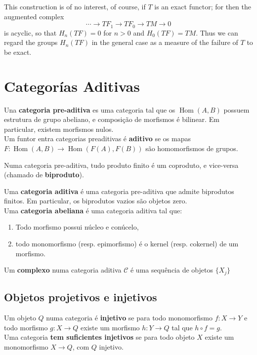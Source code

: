 This construction is of no interest, of course, if $T$ is an exact functor; for then the augmented complex
$$
\cdots \rightarrow T F_1 \rightarrow T F_0 \rightarrow T M \rightarrow 0
$$
is acyclic, so that $H_n(T F)=0$ for $n>0$ and $H_0(T F)=T M$. Thus we can regard the groups $H_n(T F)$ in the general case as a measure of the failure of $T$ to be exact.



\chapter{Categorías Aditivas}


Una \textbf{categoria pre-aditiva} es uma categoria tal que os $\operatorname{Hom}(A,B)$ possuem estrutura de grupo abeliano, e composição de morfismos é bilinear. Em particular, existem morfismos nulos.\\
Um funtor entra categorias preaditivas é \textbf{aditivo} se os mapas $F:\operatorname{Hom}(A,B)\rightarrow \operatorname{Hom}(F(A),F(B))$ são homomorfismos de grupos. 

\begin{prop}
	Numa categoria pre-aditiva, tudo produto finito é um coproduto, e vice-versa (chamado de \textbf{biproduto}). 
\end{prop}

Uma \textbf{categoria aditiva} é uma categoria pre-aditiva que admite biprodutos finitos. Em particular, os biprodutos vazios são objetos zero.\\

Uma \textbf{categoria abeliana} é uma categoria aditiva tal que:
\begin{enumerate}
	\item Todo morfismo possui núcleo e conúcelo,
	\item todo monomorfismo (resp. epimorfismo) é o kernel (resp. cokernel) de um morfismo.
\end{enumerate}


Um \textbf{complexo} numa categoria aditiva $\mathcal{C}$ é uma sequência de objetos $\{X_j\}$

\section{Objetos projetivos e injetivos}

Um objeto $Q$ numa categoria é \textbf{injetivo} se para todo monomorfismo $f:X\rightarrow Y$ e todo morfismo $g:X \rightarrow Q$ existe um morfismo $h: Y\rightarrow Q$ tal que $h\circ f =g$.\\
Uma categoria \textbf{tem suficientes injetivos} se para todo objeto $X$ existe um monomorfismo $X\rightarrow Q$, com $Q$ injetivo.


